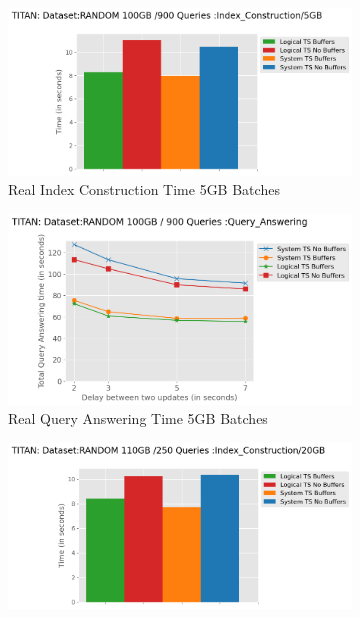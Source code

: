 \begin{figure}
	\centering
	\begin{subfigure}[c]{0.45\textwidth}
		\includegraphics[width=1\textwidth]   {figures/Experiments/Dynamic/5GB/7/indexConstruction_7_5GB.png}
		\caption{Real Index Construction Time 5GB Batches}
		\label{fig:actual-index-Construction-time-5GB}
	\end{subfigure}
	\begin{subfigure}[c]{0.45\textwidth}
		\includegraphics[width=1\textwidth]	 {figures/Experiments/Dynamic/5GB/delays_xaxis_5GB.png}
		\caption{Real Query Answering Time 5GB Batches}
		\label{fig:actual-query-answering-time-5GB}
	\end{subfigure}
	\begin{subfigure}[c]{0.45\textwidth}
		\includegraphics[width=1\textwidth]   {figures/Experiments/Dynamic/20GB/7/dataset_115343360_lockfree_Messi_ResultsindexConstruction_7_20GB.png}

\end{subfigure}
\end{figure}
